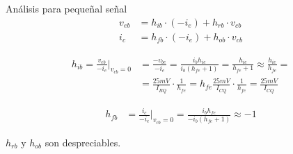 \begin{frame}[allowframebreaks]{Análisis para pequeñal señal}
\begin{align*}
    v_{eb} &= h_{ib} \cdot (-i_e) + h_{rb} \cdot v_{cb} \\[6pt]
    i_c &= h_{fb} \cdot (-i_e) + h_{ob} \cdot v_{cb}
\end{align*}

\begin{align}
    h_{ib} = \frac{v_{eb}}{-i_e} \bigg|_{v_{cb}=0} &= \frac{-v_{be}}{-i_e} = \frac{i_b h_{ie}}{i_b(h_{fe}+1)}=\frac{h_{ie}}{h_{fe}+1} \approx \frac{h_{ie}}{h_{fe}} =\nonumber \\[6pt]
    &= \frac{25mV}{I_{BQ}} \cdot \frac{1}{h_{fe}} = h_{fe} \frac{25mV}{I_{CQ}} \cdot \frac{1}{h_{fe}} = \frac{25mV}{I_{CQ}} \label{eq:hib}
\end{align}

\begin{align*}
     h_{fb} &= \frac{i_c}{-i_e} \bigg|_{v_{cb}=0} = \frac{i_{b}h_{fe}}{-i_b({h_{fe}+1})} \approx -1
\end{align*}

$h_{rb}$ y $h_{ob}$ son despreciables.
\end{frame}

